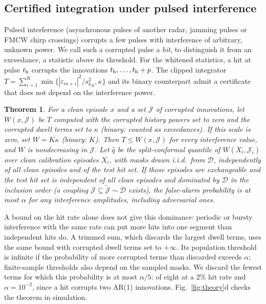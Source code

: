 \documentclass[journal]{IEEEtran}
\newtheorem{theorem}{Theorem}
\begin{document}
\subsection{Certified integration under pulsed interference}\label{sec:certsec}
Pulsed interference (asynchronous pulses of another radar, jamming pulses or FMCW chirp crossings) corrupts a few pulses with interference of arbitrary, unknown power. We call such a corrupted pulse a \emph{hit}, to distinguish it from an exceedance, a statistic above its threshold. For the whitened statistics, a hit at pulse $t_{\rm h}$ corrupts the innovations $t_{\rm h},\dots,t_{\rm h}+p$. The clipped integrator $T=\sum_{i=1}^K\min\{|\varepsilon_{m+i}|^2/s_{k_H}^2,\kappa\}$ and its binary counterpart admit a certificate that does not depend on the interference power.
\begin{theorem}\label{thm:cert}
For a clean episode $x$ and a set $\mathcal J$ of corrupted innovations, let $W(x,\mathcal J)$ be $T$ computed with the corrupted history powers set to zero and the corrupted dwell terms set to $\kappa$ (binary: counted as exceedances). If this scale is zero, set $W=K\kappa$ (binary: $K$). Then $T\le W(x,\mathcal J)$ for every interference value, and $W$ is nondecreasing in $\mathcal J$. Let $\widehat q$ be the split-conformal quantile of $W(X_i,\mathcal J_i)$ over clean calibration episodes $X_i$, with masks drawn i.i.d.\ from $\mathcal D$, independently of all clean episodes and of the test hit set. If those episodes are exchangeable and the test hit set is independent of all clean episodes and dominated by $\mathcal D$ in the inclusion order (a coupling $\mathcal J\subseteq\tilde{\mathcal J}\sim\mathcal D$ exists), the false-alarm probability is at most $\alpha$ for any interference amplitudes, including adversarial ones.
\end{theorem}
A bound on the hit rate alone does not give this dominance: periodic or bursty interference with the same rate can put more hits into one segment than independent hits do. A trimmed sum, which discards the largest dwell terms, uses the same bound with corrupted dwell terms set to $+\infty$. Its population threshold is infinite if the probability of more corrupted terms than discarded exceeds $\alpha$; finite-sample thresholds also depend on the sampled masks. We discard the fewest terms for which this probability is at most $\alpha/5$: \TrimTwo{} of eight at a 2\% hit rate and $\alpha=10^{-2}$, since a hit corrupts two AR(1) innovations. Fig.~\ref{fig:theory}d checks the theorem in simulation.
\end{document}
